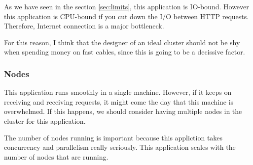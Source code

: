 As we have seen in the section \ref{sec:limits}, this application is IO-bound.
However this application is CPU-bound if you cut down the I/O between HTTP
requests. Therefore, Internet connection is a major bottleneck.

For this reason, I think that the designer of an ideal cluster should not be
shy when spending money on fast cables, since this is going to be a decissive
factor.

\subsubsection*{Nodes}

This application runs smoothly in a single machine. However, if it keeps on
receiving and receiving requests, it might come the day that this machine is
overwhelmed. If this happens, we should consider having multiple nodes in the
cluster for this application.

The number of nodes running is important because this appliction takes
concurrency and parallelism really seriously. This application scales with the
number of nodes that are running.
